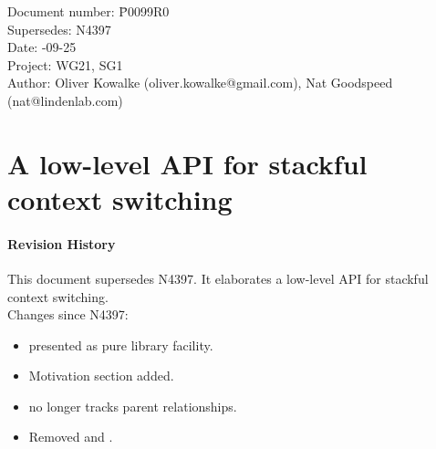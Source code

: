 \documentclass[paper=A4,pagesize,DIV=15]{scrartcl}
\begin{document}
\small
\begin{tabbing}
    Document number: \= P0099R0\\
    Supersedes:      \> N4397\\
    Date:            -09-25\\
    Project:         \> WG21, SG1\\
    Author:          \> Oliver Kowalke (oliver.kowalke@gmail.com), Nat Goodspeed (nat@lindenlab.com)\\
\end{tabbing}

\section*{A low-level API for stackful context switching}


\tableofcontents


\paragraph*{Revision History}
This document supersedes N4397. It elaborates a low-level API for stackful
context switching.\\
\newline
Changes since N4397:

\begin{itemize}
    \item {} presented as pure library facility.
    \item Motivation section added.
    \item {} no longer tracks parent relationships.
    \item Removed  and .
\end{itemize}
















\end{document}
